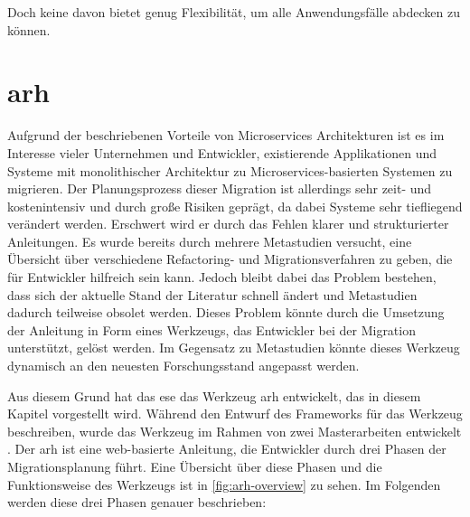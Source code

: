 Doch keine davon bietet genug Flexibilität, um alle Anwendungsfälle abdecken zu können.

\section{\acrfull{arh}}

Aufgrund der beschriebenen Vorteile von Microservices Architekturen ist es im Interesse vieler Unternehmen und Entwickler, existierende Applikationen und Systeme mit monolithischer Architektur zu Microservices-basierten Systemen zu migrieren.
Der Planungsprozess dieser Migration ist allerdings sehr zeit- und kostenintensiv und durch große Risiken geprägt, da dabei Systeme sehr tiefliegend verändert werden.
Erschwert wird er durch das Fehlen klarer und strukturierter Anleitungen.
Es wurde bereits durch mehrere Metastudien versucht, eine Übersicht über verschiedene Refactoring- und Migrationsverfahren zu geben, die für Entwickler hilfreich sein kann.
Jedoch bleibt dabei das Problem bestehen, dass sich der aktuelle Stand der Literatur schnell ändert und Metastudien dadurch teilweise obsolet werden.
Dieses Problem könnte durch die Umsetzung der Anleitung in Form eines Werkzeugs, das Entwickler bei der Migration unterstützt, gelöst werden.
Im Gegensatz zu Metastudien könnte dieses Werkzeug dynamisch an den neuesten Forschungsstand angepasst werden.

Aus diesem Grund hat das \gls{ese} das Werkzeug \gls{arh} \cite{arh-github} entwickelt, das in diesem Kapitel vorgestellt wird.
Während  den Entwurf des Frameworks für das Werkzeug beschreiben, wurde das Werkzeug im Rahmen von zwei Masterarbeiten entwickelt \cite{master-daniel-koch}\cite{master-tobias-haller}.
Der \gls{arh} ist eine web-basierte Anleitung, die Entwickler durch drei Phasen der Migrationsplanung führt.
Eine Übersicht über diese Phasen und die Funktionsweise des Werkzeugs ist in \cref{fig:arh-overview} zu sehen.
Im Folgenden werden diese drei Phasen genauer beschrieben:

